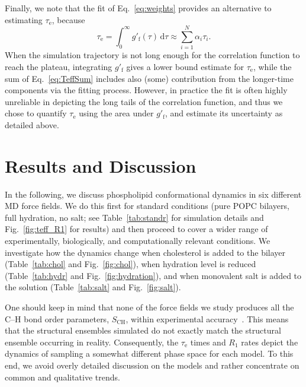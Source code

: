 \documentclass[journal=jcisd8,manuscript=article,layout=twocolumn]{achemso}
\begin{document}
Finally, we note that the fit of Eq.~\eqref{eq:weights} provides an alternative
to estimating $\tau_\mathrm{e}$, because
\begin{equation}
\label{eq:TeffSum}
\tau_\mathrm{e}
	=\int_0^\infty\!g'_\mathrm f(\tau)\,\mathrm d\tau
	\approx\sum_{i=1}^{N}\alpha_{i}\tau_{i}.
\end{equation}
When the simulation trajectory is not long enough for the correlation function to reach the plateau, integrating $g'_\mathrm f$ gives a lower bound estimate for $\tau_\mathrm{e}$, while the sum of Eq.~\eqref{eq:TeffSum} includes also (some) contribution from the longer-time components via the fitting process.
However, in practice the fit is often highly unreliable in depicting the long tails of the correlation function, and thus we chose to quantify $\tau_\mathrm{e}$ using the area under $g'_\mathrm f$, and estimate its uncertainty as detailed above.


\section{Results and Discussion}

In the following, we discuss phospholipid conformational  dynamics in
six different MD force fields. We do this first for %
standard conditions (pure POPC bilayers, full hydration, no salt;
see Table~\ref{tab:standr} for simulation details and Fig.~\ref{fig:teff_R1} for results)
%
and then proceed to
cover a wider range of experimentally, biologically, and computationally relevant conditions. We investigate how the dynamics change when cholesterol is added to the bilayer (Table~\ref{tab:chol} and Fig.~\ref{fig:chol}), when hydration level is reduced (Table~\ref{tab:hydr} and Fig.~\ref{fig:hydration}), and when monovalent salt is added to the solution (Table~\ref{tab:salt} and Fig.~\ref{fig:salt}).

One should keep in mind that none of the force fields we study
produces all the C--H bond order parameters, $S_\mathrm{CH}$, within experimental accuracy~\cite{botan15}.
%
%
This means that the structural ensembles simulated do not exactly match
the structural ensemble occurring in reality.%
%
Consequently, the
$\tau_\mathrm{e}$ times and $R_1$ rates
depict the dynamics of sampling a somewhat different phase space
for each model. %
%
To this end, we avoid overly detailed discussion on the models and rather concentrate on common and qualitative trends.
\end{document}

